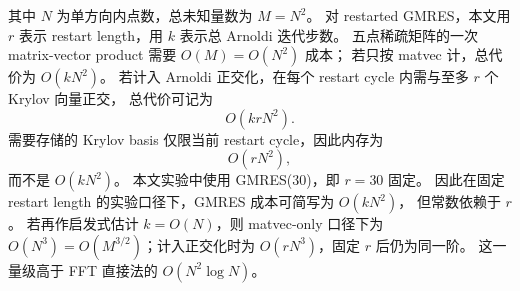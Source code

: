 其中 $N$ 为单方向内点数，总未知量数为 $M=N^2$。
对 restarted GMRES，本文用 $r$ 表示 restart length，用 $k$ 表示总 Arnoldi 迭代步数。
五点稀疏矩阵的一次 matrix-vector product 需要 $O(M)=O(N^2)$ 成本；
若只按 matvec 计，总代价为 $O(kN^2)$。
若计入 Arnoldi 正交化，在每个 restart cycle 内需与至多 $r$ 个 Krylov 向量正交，
总代价可记为
\[
  O(krN^2).
\]
需要存储的 Krylov basis 仅限当前 restart cycle，因此内存为
\[
  O(rN^2),
\]
而不是 $O(kN^2)$。
本文实验中使用 GMRES(30)，即 $r=30$ 固定。
因此在固定 restart length 的实验口径下，GMRES 成本可简写为 $O(kN^2)$，
但常数依赖于 $r$。
若再作启发式估计 $k=O(N)$，则 matvec-only 口径下为
$O(N^3)=O(M^{3/2})$；计入正交化时为 $O(rN^3)$，固定 $r$ 后仍为同一阶。
这一量级高于 FFT 直接法的 $O(N^2 \log N)$。
